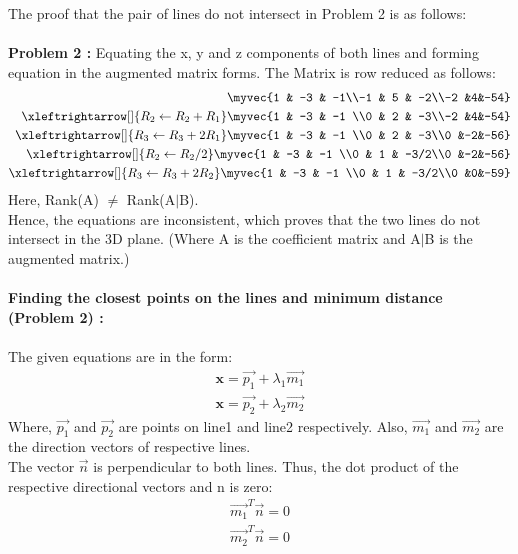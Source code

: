 \documentclass[journal,12pt,twocolumn]{IEEEtran}
\begin{document}
\newpage \noindent
The proof that the pair of lines do not intersect in Problem 2 is as follows:\\
\\
\textbf{Problem 2 :} Equating the x, y and z components of both lines and forming equation in the augmented matrix forms. The Matrix is row reduced as follows:\\
\begin{align}
\myvec{1 & -3 & -1\\-1 & 5 & -2\\-2 &4&-54}\\
\xleftrightarrow[]{R_2\leftarrow R_2+R_1}
\myvec{1 & -3 & -1 \\0 & 2 & -3\\-2 &4&-54}\\
\xleftrightarrow[]{R_3\leftarrow R_3+2R_1}   
\myvec{1 & -3 & -1 \\0 & 2 & -3\\0 &-2&-56}\\
\xleftrightarrow[]{R_2\leftarrow R_2/2}
\myvec{1 & -3 & -1 \\0 & 1 & -3/2\\0 &-2&-56}\\
\xleftrightarrow[]{R_3\leftarrow R_3+2R_2}
\myvec{1 & -3 & -1 \\0 & 1 & -3/2\\0 &0&-59}
\end{align} 
Here, Rank(A) $\neq$ Rank(A$\mid$B).
\\
Hence, the equations are inconsistent, which proves that the two lines do not intersect in the 3D plane. (Where A is the coefficient matrix and A$\mid$B is the augmented matrix.) \\
\\
\noindent
\textbf{Finding the closest points on the lines and minimum distance (Problem 2) :}\\
\\
The given equations are in the form:
\begin{align}
    \textbf{x}=\vec{p_1} + \lambda_1\vec{m_1}\\
    \textbf{x}=\vec{p_2} + \lambda_2\vec{m_2}
\end{align}
Where, $\vec{p_1}$ and $\vec{p_2}$ are points on line1 and line2 respectively. Also, $\vec{m_1}$ and $\vec{m_2}$ are the direction vectors of respective lines.
\\
The vector $\vec{n}$ is perpendicular to both lines. Thus, the dot product of the respective directional vectors and n is zero:
\begin{align}
    \vec{m_1}^T\vec{n} =  0\\
    \vec{m_2}^T\vec{n} =  0
\end{align}
\end{document}
